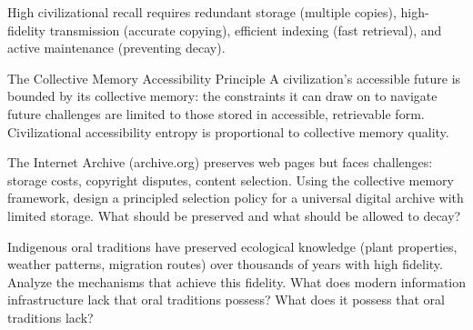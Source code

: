 High civilizational recall requires redundant storage (multiple copies),
high-fidelity transmission (accurate copying), efficient indexing
(fast retrieval), and active maintenance (preventing decay).

\begin{namedthm}{The Collective Memory Accessibility Principle}
  A civilization's accessible future is bounded by its collective memory:
  the constraints it can draw on to navigate future challenges are limited
  to those stored in accessible, retrievable form. Civilizational
  accessibility entropy is proportional to collective memory quality.
\end{namedthm}

\begin{exercise}
  The Internet Archive (archive.org) preserves web pages but faces
  challenges: storage costs, copyright disputes, content selection.
  Using the collective memory framework, design a principled
  selection policy for a universal digital archive with limited
  storage. What should be preserved and what should be allowed to decay?
\end{exercise}

\begin{exercise}
  Indigenous oral traditions have preserved ecological knowledge
  (plant properties, weather patterns, migration routes) over
  thousands of years with high fidelity. Analyze the mechanisms
  that achieve this fidelity. What does modern information infrastructure
  lack that oral traditions possess? What does it possess that
  oral traditions lack?
\end{exercise}
